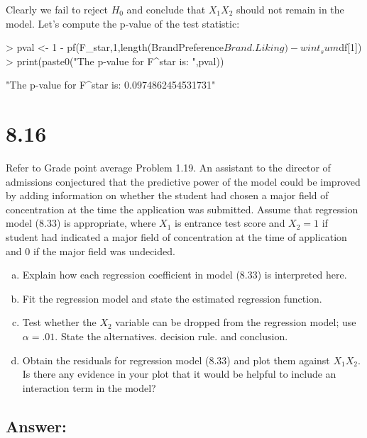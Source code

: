 \documentclass{article}
\begin{document}
\begin{enumerate}[a)]
Clearly we fail to reject $H_0$ and conclude that $X_1X_2$ should not remain in the model. Let's compute the p-value of the test statistic:

\begin{Schunk}
\begin{Sinput}
> pval <- 1 - pf(F_star,1,length(BrandPreference$Brand.Liking)-wint_sum$df[1])
> print(paste0("The p-value for F^star is: ",pval))
\end{Sinput}
\begin{Soutput}
[1] "The p-value for F^star is: 0.0974862454531731"
\end{Soutput}
\end{Schunk}

\end{enumerate}

\section{8.16}

Refer to Grade point average Problem 1.19. An assistant to the director of admissions conjectured that the predictive power of the model could be improved by adding information on whether the student had chosen a major field of concentration at the time the application was submitted. Assume that regression model (8.33) is appropriate, where $X_1$ is entrance test score and $X_2 = 1$ if student had indicated a major field of concentration at the time of application and 0 if the major field was undecided. 

\begin{enumerate}[a)]
\item{} Explain how each regression coefficient in model (8.33) is interpreted here.
\item{} Fit the regression model and state the estimated regression function.
\item{} Test whether the $X_2$ variable can be dropped from the regression model; use $\alpha{} = .01$. State the alternatives. decision rule. and conclusion.
\item{} Obtain the residuals for regression model (8.33) and plot them against $X_1X_2$. Is there any evidence in your plot that it would be helpful to include an interaction term in the model?
\end{enumerate}

\subsection{Answer:}
\end{document}
